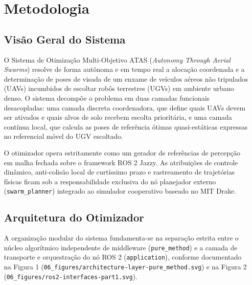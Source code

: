 \documentclass[
  brazilian,
  a4paper]{article}
\begin{document}
\section{Metodologia}\label{metodologia}

\subsection{Visão Geral do Sistema}\label{visuxe3o-geral-do-sistema}

O Sistema de Otimização Multi-Objetivo ATAS (\emph{Autonomy Through
Aerial Swarms}) resolve de forma autônoma e em tempo real a alocação
coordenada e a determinação de poses de visada de um enxame de veículos
aéreos não tripulados (UAVs) incumbidos de escoltar robôs terrestres
(UGVs) em ambiente urbano denso. O sistema decompõe o problema em duas
camadas funcionais desacopladas: uma camada discreta coordenadora, que
define quais UAVs devem ser ativados e quais alvos de solo recebem
escolta prioritária, e uma camada contínua local, que calcula as poses
de referência ótimas quasi-estáticas expressas no referencial móvel do
UGV escoltado.

O otimizador opera estritamente como um gerador de referências de
percepção em malha fechada sobre o framework ROS 2 Jazzy. As atribuições
de controle dinâmico, anti-colisão local de curtíssimo prazo e
rastreamento de trajetórias físicas ficam sob a responsabilidade
exclusiva do nó planejador externo (\texttt{swarm\_\allowbreak{}planner}) integrado
ao simulador cooperativo baseado no MIT Drake.

\subsection{Arquitetura do Otimizador}\label{arquitetura-do-otimizador}

A organização modular do sistema fundamenta-se na separação estrita
entre o núcleo algorítmico independente de middleware
(\texttt{pure\_\allowbreak{}method}) e a camada de transporte e orquestração do nó
ROS 2 (\texttt{application}), conforme documentado na Figura 1
(\texttt{06\_\allowbreak{}figures/\allowbreak{}architecture-layer-pure\_\allowbreak{}method.\allowbreak{}svg}) e na Figura 2
(\texttt{06\_\allowbreak{}figures/\allowbreak{}ros2-interfaces-part1.\allowbreak{}svg}).
\end{document}
